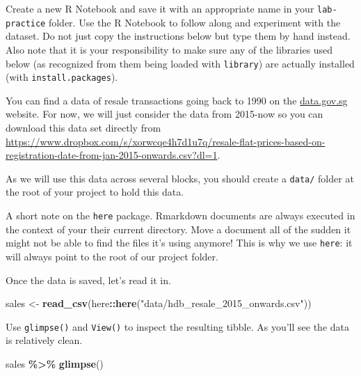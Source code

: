 \documentclass[]{book}
\newenvironment{Shaded}{\begin{snugshade}}{\end{snugshade}}
\newcommand{\KeywordTok}[1]{\textcolor[rgb]{0.13,0.29,0.53}{\textbf{#1}}}
\newcommand{\NormalTok}[1]{#1}
\newcommand{\OperatorTok}[1]{\textcolor[rgb]{0.81,0.36,0.00}{\textbf{#1}}}
\newcommand{\StringTok}[1]{\textcolor[rgb]{0.31,0.60,0.02}{#1}}
\begin{document}
Create a new R Notebook and save it with an appropriate name in your \texttt{lab-practice} folder. Use the R Notebook to follow along and experiment with the dataset. Do not just copy the instructions below but type them by hand instead. Also note that it is your responsibility to make sure any of the libraries used below (as recognized from them being loaded with \texttt{library}) are actually installed (with \texttt{install.packages}).

You can find a data of resale transactions going back to 1990 on the \href{https://data.gov.sg/dataset/resale-flat-prices}{data.gov.sg} website. For now, we will just consider the data from 2015-now so you can download this data set directly from \url{https://www.dropbox.com/s/xorwcqe4h7d1u7q/resale-flat-prices-based-on-registration-date-from-jan-2015-onwards.csv?dl=1}.

As we will use this data across several blocks, you should create a \texttt{data/} folder at the root of your project to hold this data.

A short note on the \texttt{here} package. Rmarkdown documents are always executed in the context of your their current directory. Move a document all of the sudden it might not be able to find the files it's using anymore! This is why we use \texttt{here}: it will always point to the root of our project folder.

Once the data is saved, let's read it in.

\begin{Shaded}
\begin{Highlighting}[]
\NormalTok{sales <{-}}\StringTok{ }\KeywordTok{read\_csv}\NormalTok{(here}\OperatorTok{::}\KeywordTok{here}\NormalTok{(}\StringTok{"data/hdb\_resale\_2015\_onwards.csv"}\NormalTok{))}
\end{Highlighting}
\end{Shaded}

Use \texttt{glimpse()} and \texttt{View()} to inspect the resulting tibble. As you'll see the data is relatively clean.

\begin{Shaded}
\begin{Highlighting}[]
\NormalTok{sales }\OperatorTok{\%>\%}\StringTok{ }\KeywordTok{glimpse}\NormalTok{()}
\end{Highlighting}
\end{Shaded}
\end{document}
